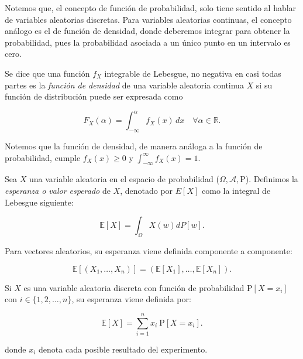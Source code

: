 Notemos que, el concepto de función de probabilidad, solo tiene sentido al hablar de variables aleatorias discretas. Para variables aleatorias continuas, el concepto análogo es el de función de densidad, donde deberemos integrar para obtener la probabilidad, pues la probabilidad asociada a un único punto en un intervalo es cero.\newline

\begin{definicion}\label{def:funcion-de-densidad}
    Se dice que una función $f_X$ integrable de Lebesgue, no negativa en casi todas partes es la \emph{función de densidad} de una variable aleatoria continua $X$ si su función de distribución puede ser expresada como

    \[ F_X(\alpha) =  \int_{-\infty}^{\alpha} f_X(x) \, dx \quad \forall \alpha \in \mathbb{R}. \]
\end{definicion}

Notemos que la función de densidad, de manera análoga a la función de probabilidad, cumple $ f_X(x) \ge 0$ y $ \int_{-\infty}^{\infty} f_X(x) = 1$.\newline

\begin{definicion}\label{def:esperanza-variable-aleatoria}
Sea $X$ una variable aleatoria en el espacio de probabilidad ($\Omega, \mathcal{A}, \mathrm{P}$). Definimos la \emph{esperanza o valor esperado} de $X$, denotado por $E[X]$ como la integral de Lebesgue siguiente:

\[ \mathbb{E}[X] = \int_{\Omega} X(w)dP[w]. \]

Para vectores aleatorios, su esperanza viene definida componente a componente:

\[ \mathbb{E}[(X_1, \ldots, X_n)] = (\mathbb{E}[X_1], \ldots, \mathbb{E}[X_n]). \]\newline
\end{definicion}

\begin{observacion}
    Si $X$ es una variable aleatoria discreta con función de probabilidad $\mathrm{P}[X = x_i]$ con $i \in \{1,2,\ldots,n\}$, su esperanza viene definida por:

    \[ \mathbb{E}[X] = \sum_{i=1}^{n} x_i \: \mathrm{P}[X = x_i]. \]

    donde $x_i$ denota cada posible resultado del experimento.\newline
\end{observacion}

